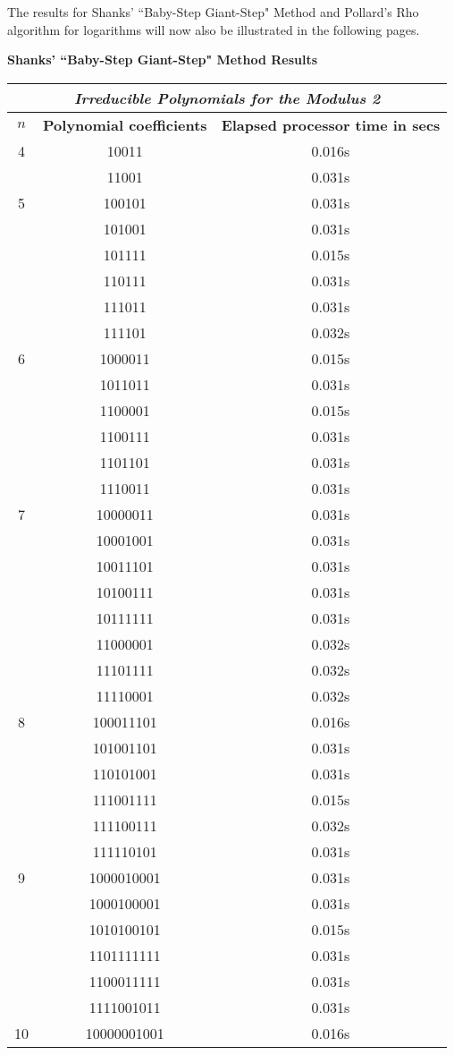 \documentclass[iwp,first]{luthesis}
\begin{document}
The results for Shanks' ``Baby-Step Giant-Step" Method and Pollard's Rho algorithm for logarithms will now also be illustrated in the following pages.

\newpage

\textbf{Shanks' ``Baby-Step Giant-Step" Method Results}
\\
\begin{center}
\begin{tabular}{|c|c|c|}
\hline
\multicolumn{3}{|c|}{\textit{Irreducible Polynomials for the Modulus 2}} \\
\hline
\textbf{$n$} & \textbf{Polynomial coefficients} & \textbf{Elapsed processor time in secs} \\ \hline
4 & 10011 & 0.016s  \\ 
 & 11001 & 0.031s \\ \hline
5 & 100101 & 0.031s \\ 
 & 101001 & 0.031s \\
 & 101111 & 0.015s \\
 & 110111 & 0.031s \\
 & 111011 & 0.031s \\
 & 111101 & 0.032s \\ \hline
6 & 1000011 & 0.015s \\
 & 1011011 & 0.031s\\
 & 1100001 & 0.015s \\
 & 1100111 & 0.031s \\
 & 1101101 & 0.031s \\
 & 1110011 & 0.031s \\ \hline
7 & 10000011 & 0.031s \\
 & 10001001 & 0.031s \\
 & 10011101 & 0.031s \\
 & 10100111 & 0.031s \\
 & 10111111 & 0.031s \\
 & 11000001 & 0.032s \\
 & 11101111 & 0.032s \\
 & 11110001 & 0.032s \\ \hline
8 & 100011101 & 0.016s \\
 & 101001101 & 0.031s \\
 & 110101001 & 0.031s \\
 & 111001111 & 0.015s \\
 & 111100111 & 0.032s \\
 & 111110101 & 0.031s \\ \hline
9 & 1000010001 & 0.031s \\
 & 1000100001 & 0.031s \\
 & 1010100101 & 0.015s \\
 & 1101111111 & 0.031s \\
 & 1100011111 & 0.031s \\
 & 1111001011 & 0.031s \\ \hline
10 & 10000001001 & 0.016s\\
\hline
\end{tabular}
\end{center}
\end{document}
